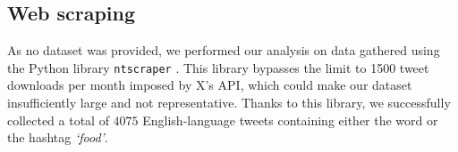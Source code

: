 \documentclass{article}
\begin{document}
\subsection{Web scraping}
As no dataset was provided, we performed our analysis on data gathered using the Python library \texttt{ntscraper} \cite{ntsraper}. This library bypasses the limit to 1500 tweet downloads per month imposed by X's API, which could make our dataset insufficiently large and not representative.
Thanks to this library, we successfully collected a total of $4075$ English-language tweets containing either the word or the hashtag \textit{`food'}.
\end{document}
